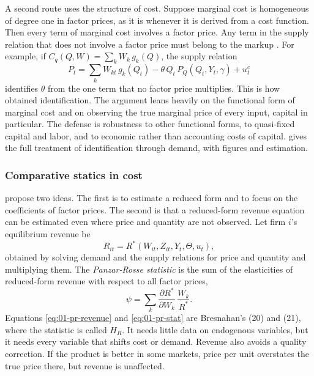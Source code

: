 A second route uses the structure of cost. Suppose marginal cost is homogeneous of degree one in factor prices, as it is
whenever it is derived from a cost function. Then every term of marginal cost involves a factor price. Any term in the
supply relation that does not involve a factor price must belong to the markup \citep[p.~1034]{Bresnahan1989}. For example, if
$C_q(Q, W) = \sum_k W_k\, g_k(Q)$, the supply relation
\begin{equation*}
P_t = \sum_k W_{kt}\, g_k(Q_t) - \theta\, Q_t\, P_Q(Q_t, Y_t, \gamma) + u^c_t
\end{equation*}
identifies $\theta$ from the one term that no factor price multiplies. This is how \citet{Appelbaum1979,Appelbaum1982}
obtained identification. The argument leans heavily on the functional form of marginal cost and on observing the true
marginal price of every input, capital in particular. The defense is robustness to other functional forms, to
quasi-fixed capital and labor, and to economic rather than accounting costs of capital.  gives the
full treatment of identification through demand, with figures and estimation.

\subsubsection{Comparative statics in cost}\label{sec:01-id-cost}

\citet{PanzarRosse1987} propose two ideas. The first is to estimate a reduced form and to focus on the coefficients of
factor prices. The second is that a reduced-form revenue equation can be estimated even where price and quantity are
not observed. Let firm $i$'s equilibrium revenue be
\begin{equation}\label{eq:01-pr-revenue}
R_{it} = R^*(W_{it}, Z_{it}, Y_t, \Theta, u_t),
\end{equation}
obtained by solving demand and the supply relations for price and quantity and multiplying them. The
\emph{Panzar-Rosse statistic} is the sum of the elasticities of reduced-form revenue with respect to all factor prices,
\begin{equation}\label{eq:01-pr-stat}
\psi = \sum_k \frac{\partial R^*}{\partial W_k}\,\frac{W_k}{R^*} .
\end{equation}
Equations \eqref{eq:01-pr-revenue} and \eqref{eq:01-pr-stat} are Bresnahan's (20) and (21), where the statistic is
called $H_R$. It needs little data on endogenous variables, but it needs every variable that shifts cost or demand.
Revenue also avoids a quality correction. If the product is better in some markets, price per unit overstates the true
price there, but revenue is unaffected.

